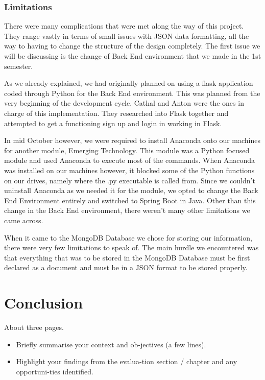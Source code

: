 \subsection{Limitations}
There were many complications that were met along the way of this project. They range vastly in terms of small issues with JSON data formatting, all the way to having to change the structure of the design completely. The first issue we will be discussing is the change of Back End environment that we made in the 1st semester. \par
As we already explained, we had originally planned on using a flask application coded through Python for the Back End environment. This was planned from the very beginning of the development cycle. Cathal and Anton were the ones in charge of this implementation. They researched into Flask together and attempted to get a functioning sign up and login in working in Flask. \par
In mid October however, we were required to install Anaconda onto our machines for another module, Emerging Technology. This module was a Python focused module and used Anaconda to execute most of the commands. When Anaconda was installed on our machines however, it blocked some of the Python functions on our drives, namely where the .py executable is called from. Since we couldn't uninstall Anaconda as we needed it for the module, we opted to change the Back End Environment entirely and switched to Spring Boot in Java. Other than this change in the Back End environment, there weren't many other limitations we came across. \par
When it came to the MongoDB Database we chose for storing our information, there were very few limitations to speak of. The main hurdle we encountered was that everything that was to be stored in the MongoDB Database must be first declared as a document and must be in a JSON format to be stored properly.

\chapter{Conclusion}
About three pages.

\begin{itemize}
Briefly summarise your context and objectives.
– Remind the reader about the overall rationale and goals of the
project.
q Highlight your findings from the System Evaluation chapter.
– List out the outcomes of the project in a bulleted list.
– Serendipity – did you gain any tangential or even unrelated insights
by happenchance during the project?
• Lots of discoveries have been made this way, e.g. Flemming
and antibiotics.
– State any opportunities identified for future investigation.
q Finish on an upbeat note.
\item Briefly summarise your context and ob-jectives (a few lines).
\item Highlight your findings from the evalua-tion section / chapter and any opportuni-ties identified.
\end{itemize}
